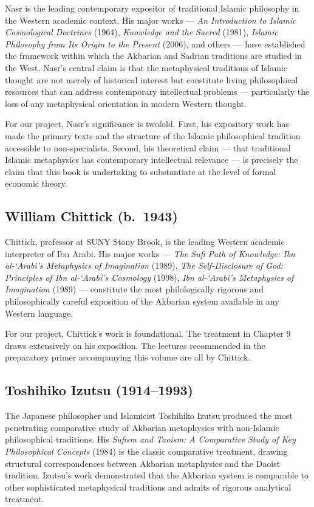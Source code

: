 Nasr is the leading contemporary expositor of traditional Islamic
philosophy in the Western academic context. His major works ---
\textit{An Introduction to Islamic Cosmological Doctrines} (1964),
\textit{Knowledge and the Sacred} (1981), \textit{Islamic Philosophy
from Its Origin to the Present} (2006), and others --- have
established the framework within which the Akbarian and Sadrian
traditions are studied in the West. Nasr's central claim is that the
metaphysical traditions of Islamic thought are not merely of
historical interest but constitute living philosophical resources
that can address contemporary intellectual problems --- particularly
the loss of any metaphysical orientation in modern Western thought.

For our project, Nasr's significance is twofold. First, his
expository work has made the primary texts and the structure of the
Islamic philosophical tradition accessible to non-specialists.
Second, his theoretical claim --- that traditional Islamic
metaphysics has contemporary intellectual relevance --- is precisely
the claim that this book is undertaking to substantiate at the level
of formal economic theory.

\subsection{William Chittick (b.~1943)}

Chittick, professor at SUNY Stony Brook, is the leading Western
academic interpreter of Ibn Arabi. His major works ---
\textit{The Sufi Path of Knowledge: Ibn al-`Arabi's Metaphysics of
Imagination} (1989), \textit{The Self-Disclosure of God: Principles
of Ibn al-`Arabi's Cosmology} (1998), \textit{Ibn al-`Arabi's
Metaphysics of Imagination} (1989) --- constitute the most
philologically rigorous and philosophically careful exposition of
the Akbarian system available in any Western language.

For our project, Chittick's work is foundational. The treatment in
Chapter 9 draws extensively on his exposition. The lectures
recommended in the preparatory primer accompanying this volume are
all by Chittick.

\subsection{Toshihiko Izutsu (1914--1993)}

The Japanese philosopher and Islamicist Toshihiko Izutsu produced
the most penetrating comparative study of Akbarian metaphysics with
non-Islamic philosophical traditions. His \textit{Sufism and Taoism:
A Comparative Study of Key Philosophical Concepts} (1984) is the
classic comparative treatment, drawing structural correspondences
between Akbarian metaphysics and the Daoist tradition. Izutsu's work
demonstrated that the Akbarian system is comparable to other
sophisticated metaphysical traditions and admits of rigorous
analytical treatment.

